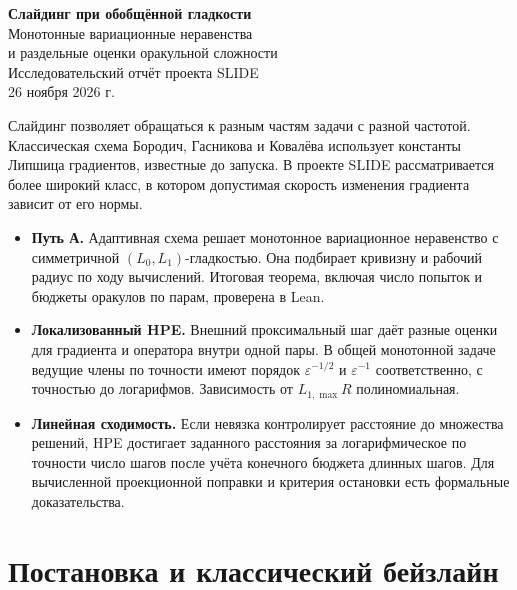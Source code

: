 \documentclass[12pt,a4paper]{article}
\begin{document}
\begin{center}
  {\Large\bfseries Слайдинг при обобщённой гладкости}\\[2pt]
  {\large Монотонные вариационные неравенства}\\[-1pt]
  {\large и раздельные оценки оракульной сложности}\\[6pt]
  Исследовательский отчёт проекта SLIDE\\[2pt]
  26 ноября 2026 г.
\end{center}

Слайдинг позволяет обращаться к разным частям задачи с разной частотой.
Классическая схема Бородич, Гасникова и Ковалёва использует константы
Липшица градиентов, известные до запуска. В проекте SLIDE рассматривается
более широкий класс, в котором допустимая скорость изменения градиента
зависит от его нормы.

\begin{itemize}
\item \textbf{Путь А.} Адаптивная схема решает монотонное вариационное
неравенство с симметричной $(L_0,L_1)$-гладкостью. Она подбирает кривизну
и рабочий радиус по ходу вычислений. Итоговая теорема, включая число
попыток и бюджеты оракулов по парам, проверена в Lean.
\item \textbf{Локализованный HPE.} Внешний проксимальный шаг даёт
разные оценки для градиента и оператора внутри одной пары.
В общей монотонной задаче ведущие члены по точности имеют порядок
$\varepsilon^{-1/2}$ и $\varepsilon^{-1}$ соответственно, с точностью
до логарифмов. Зависимость от $L_{1,\max}R$ полиномиальная.
\item \textbf{Линейная сходимость.} Если невязка контролирует расстояние
до множества решений, HPE достигает заданного расстояния за логарифмическое
по точности число шагов после учёта конечного бюджета длинных шагов.
Для вычисленной проекционной поправки и критерия остановки есть
формальные доказательства.
\end{itemize}

\setcounter{tocdepth}{1}
\tableofcontents

\clearpage
\section{Постановка и классический бейзлайн}\label{sec:setup}
\end{document}
